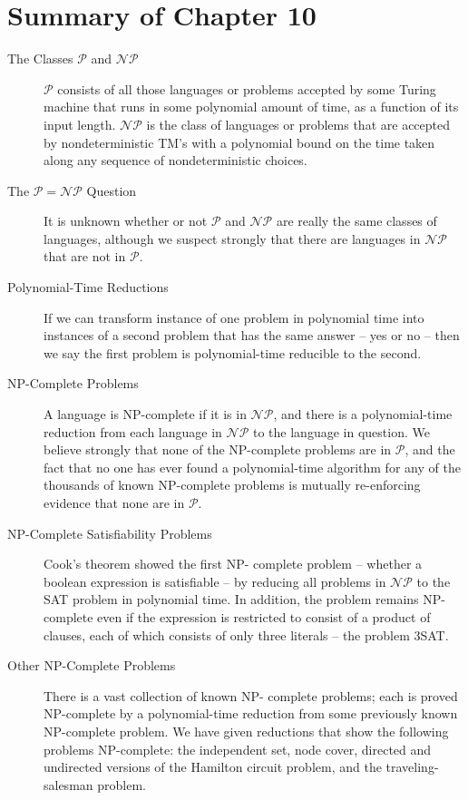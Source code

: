 \documentclass[]{article}
\begin{document}
\section*{Summary of Chapter 10}
\begin{description}
\item[The Classes $\mathcal{P}$ and $\mathcal{NP}$] $\mathcal{P}$ consists of
all those languages or problems accepted by some Turing machine that runs in
some polynomial amount of time, as a function of its input length.
$\mathcal{NP}$ is the class of languages or problems that are accepted by
nondeterministic TM's with a polynomial bound on the time taken along any
sequence of nondeterministic choices.
\item[The $\mathcal{P} = \mathcal{NP}$ Question] It is unknown whether or not
$\mathcal{P}$ and $\mathcal{NP}$ are really the same classes of languages,
although we suspect strongly that there are languages in $\mathcal{NP}$ that are
not in $\mathcal{P}$.
\item[Polynomial-Time Reductions] If we can transform instance of one problem in
polynomial time into instances of a second problem that has the same answer --
yes or no -- then we say the first problem is polynomial-time reducible to the
second.
\item[NP-Complete Problems] A language is NP-complete if it is in
$\mathcal{NP}$, and there is a polynomial-time reduction from each language in
$\mathcal{NP}$ to the language in question. We believe strongly that none of the
NP-complete problems are in $\mathcal{P}$, and the fact that no one has ever
found a polynomial-time algorithm for any of the thousands of known NP-complete
problems is mutually re-enforcing evidence that none are in $\mathcal{P}$.
\item[NP-Complete Satisfiability Problems] Cook's theorem showed the first NP-
complete problem -- whether a boolean expression is satisfiable -- by reducing
all problems in $\mathcal{NP}$ to the SAT problem in polynomial time. In
addition, the problem remains NP-complete even if the expression is restricted
to consist of a product of clauses, each of which consists of only three
literals -- the problem 3SAT.
\item[Other NP-Complete Problems] There is a vast collection of known NP-
complete problems; each is proved NP-complete by a polynomial-time reduction
from some previously known NP-complete problem. We have given reductions that
show the following problems NP-complete: the independent set, node cover,
directed and undirected versions of the Hamilton circuit problem, and the
traveling-salesman problem.
\end{description}
\end{document}
